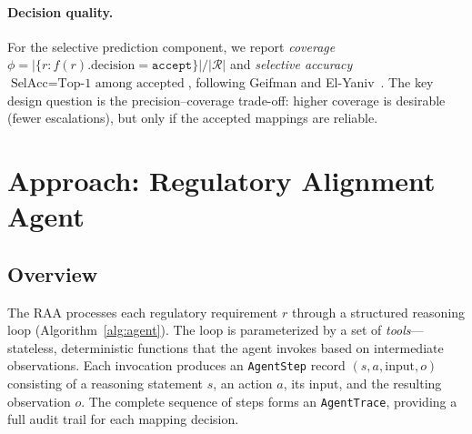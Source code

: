 \documentclass{sn-jnl}
\begin{document}
\paragraph{Decision quality.}
For the selective prediction component, we report \emph{coverage} $\phi = |\{r : f(r).\text{decision} = \texttt{accept}\}| / |\mathcal{R}|$ and \emph{selective accuracy} $\text{SelAcc} = \text{Top-1 among accepted}$, following Geifman and El-Yaniv~\cite{Geifman2017}.
The key design question is the precision--coverage trade-off: higher coverage is desirable (fewer escalations), but only if the accepted mappings are reliable.


\section{Approach: Regulatory Alignment Agent}
\label{sec:architecture}

\subsection{Overview}

The RAA processes each regulatory requirement $r$ through a structured reasoning loop (Algorithm~\ref{alg:agent}).
The loop is parameterized by a set of \emph{tools}---stateless, deterministic functions that the agent invokes based on intermediate observations.
Each invocation produces an \texttt{AgentStep} record $(s, a, \text{input}, o)$ consisting of a reasoning statement $s$, an action $a$, its input, and the resulting observation $o$.
The complete sequence of steps forms an \texttt{AgentTrace}, providing a full audit trail for each mapping decision.
\end{document}
